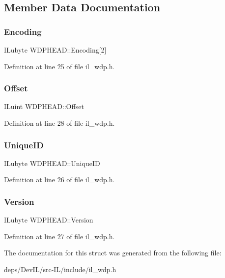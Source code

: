 \subsection{Member Data Documentation}
\mbox{\label{structWDPHEAD_ab7d6b150e26fc8e565d479a1ba6cd3bd}} 
\subsubsection{\texorpdfstring{Encoding}{Encoding}}
{\footnotesize\ttfamily I\+Lubyte W\+D\+P\+H\+E\+A\+D\+::\+Encoding\mbox{[}2\mbox{]}}



Definition at line 25 of file il\+\_\+wdp.\+h.

\mbox{\label{structWDPHEAD_abe59df29c41375d0eec83f910ec4d587}} 
\subsubsection{\texorpdfstring{Offset}{Offset}}
{\footnotesize\ttfamily I\+Luint W\+D\+P\+H\+E\+A\+D\+::\+Offset}



Definition at line 28 of file il\+\_\+wdp.\+h.

\mbox{\label{structWDPHEAD_ac2a1c9b2779bebeed03a43ee2e8a939a}} 
\subsubsection{\texorpdfstring{Unique\+ID}{UniqueID}}
{\footnotesize\ttfamily I\+Lubyte W\+D\+P\+H\+E\+A\+D\+::\+Unique\+ID}



Definition at line 26 of file il\+\_\+wdp.\+h.

\mbox{\label{structWDPHEAD_a1f62770a182d840a076baf6a14f2b4c7}} 
\subsubsection{\texorpdfstring{Version}{Version}}
{\footnotesize\ttfamily I\+Lubyte W\+D\+P\+H\+E\+A\+D\+::\+Version}



Definition at line 27 of file il\+\_\+wdp.\+h.



The documentation for this struct was generated from the following file\+:\begin{DoxyCompactItemize}
\item 
deps/\+Dev\+I\+L/src-\/\+I\+L/include/il\+\_\+wdp.\+h\end{DoxyCompactItemize}
